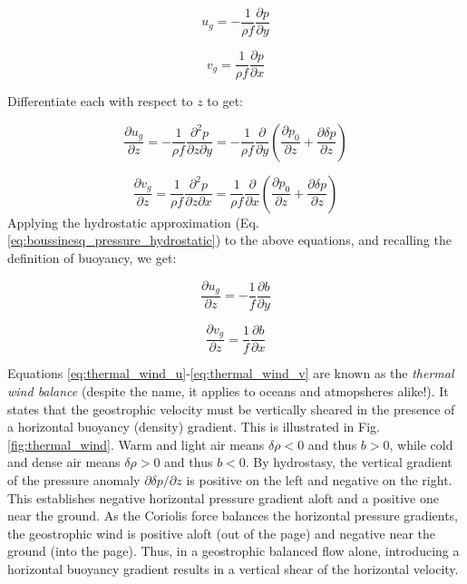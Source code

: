 \documentclass[12pt]{article}
\numberwithin{equation}{section}
\numberwithin{figure}{section}
\numberwithin{table}{section}
\begin{document}
\begin{equation}
  u_g = - \frac{1}{\rho f} \frac{\partial p}{\partial y}
  \label{eq:geostrophic_u}
\end{equation}

\begin{equation}
  v_g = \frac{1}{\rho f} \frac{\partial p}{\partial x}
  \label{eq:geostrophic_v}
\end{equation}

Differentiate each with respect to $z$ to get:

\begin{equation}
  \frac{\partial u_g}{\partial z} =
  - \frac{1}{\rho f} \frac{\partial^2 p}{\partial z \partial y} =
  - \frac{1}{\rho f} \frac{\partial}{\partial y} \left( \frac{\partial p_0}{\partial z} + \frac{\partial \delta p}{\partial z} \right)
\end{equation}

\begin{equation}
  \frac{\partial v_g}{\partial z} =
  \frac{1}{\rho f} \frac{\partial^2 p}{\partial z \partial x} =
  \frac{1}{\rho f} \frac{\partial}{\partial x} \left( \frac{\partial p_0}{\partial z} + \frac{\partial \delta p}{\partial z} \right)
\end{equation}
Applying the hydrostatic approximation (Eq. \ref{eq:boussinesq_pressure_hydrostatic})
to the above equations, and recalling the definition of buoyancy, we get:

\begin{equation}
  \frac{\partial u_g}{\partial z} =
  - \frac{1}{f} \frac{\partial b}{\partial y}
  \label{eq:thermal_wind_u}
\end{equation}

\begin{equation}
  \frac{\partial v_g}{\partial z} =
  \frac{1}{f} \frac{\partial b}{\partial x}
  \label{eq:thermal_wind_v}
\end{equation}

Equations \ref{eq:thermal_wind_u}-\ref{eq:thermal_wind_v} are known as the
\textit{thermal wind balance}
(despite the name, it applies to oceans and atmopsheres alike!).
It states that the geostrophic velocity must be vertically sheared in the
presence of a horizontal buoyancy (density) gradient. 
This is illustrated in Fig. \ref{fig:thermal_wind}.
Warm and light air means $\delta \rho < 0$ and thus $b > 0$, while cold and dense
air means $\delta \rho > 0$ and thus $b < 0$.
By hydrostasy, the vertical gradient of the pressure anomaly
$\partial \delta p / \partial z$ is positive on the left and negative on the right.
This establishes negative horizontal pressure gradient aloft and a positive one
near the ground.
As the Coriolis force balances the horizontal pressure gradients, the geostrophic
wind is positive aloft (out of the page) and negative near the ground (into the page).
Thus, in a geostrophic balanced flow alone, introducing a horizontal buoyancy gradient
results in a vertical shear of the horizontal velocity.
\end{document}
